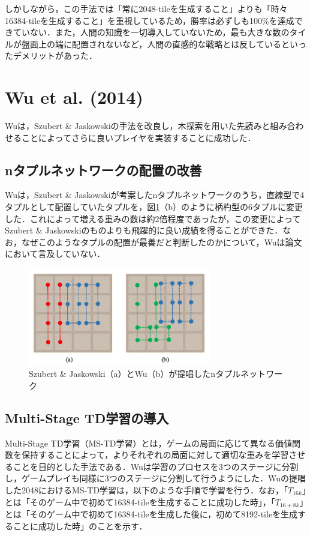 \documentclass{suribt}
\begin{document}
しかしながら，この手法では「常に2048-tileを生成すること」よりも「時々16384-tileを生成すること」を重視しているため，勝率は必ずしも100\%を達成できていない．また，人間の知識を一切導入していないため，最も大きな数のタイルが盤面上の端に配置されないなど，人間の直感的な戦略とは反しているといったデメリットがあった．

\section{Wu et al. (2014)}
Wuは，Szubert \& Jaskowskiの手法を改良し，木探索を用いた先読みと組み合わせることによってさらに良いプレイヤを実装することに成功した．
\subsection{nタプルネットワークの配置の改善}
Wuは，Szubert \& Jaskowskiが考案したnタプルネットワークのうち，直線型で4タプルとして配置していたタプルを，図\ref{figure_002}（b）のように柄杓型の6タプルに変更した．これによって増える重みの数は約2倍程度であったが，この変更によってSzubert \& Jaskowskiのものよりも飛躍的に良い成績を得ることができた．なお，なぜこのようなタプルの配置が最善だと判断したのかについて，Wuは論文において言及していない．

\begin{figure}[t]
	\begin{center}
	\includegraphics[width=8cm]{figure_002.png}
	\caption{Szubert \& Jaskowski（a）とWu（b）が提唱したnタプルネットワーク}
	\label{figure_002}
	\end{center}
\end{figure}

\subsection{Multi-Stage TD学習の導入}
Multi-Stage TD学習（MS-TD学習）とは，ゲームの局面に応じて異なる価値関数を保持することによって，よりそれぞれの局面に対して適切な重みを学習させることを目的とした手法である．Wuは学習のプロセスを3つのステージに分割し，ゲームプレイも同様に3つのステージに分割して行うようにした．Wuの提唱した2048におけるMS-TD学習は，以下のような手順で学習を行う．なお，「$T_{16k}$」とは「そのゲーム中で初めて16384-tileを生成することに成功した時」，「$T_{16+8k}$」とは「そのゲーム中で初めて16384-tileを生成した後に，初めて8192-tileを生成することに成功した時」のことを示す．
\end{document}
